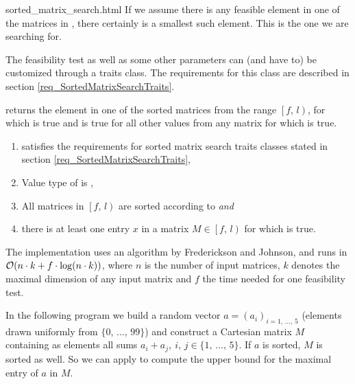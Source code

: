 \begin{ccAdvanced}
\begin{ccHtmlClassFile}{sorted_matrix_search.html}
    If we assume there is any feasible element in one of the matrices in
    , there
    certainly is a smallest such element. This is the one we are
    searching for.

    The feasibility test as well as some other parameters can (and have
    to) be customized through a traits class. The requirements for this
    class are described in section \ref{req_SortedMatrixSearchTraits}.


    \def\ccLongParamLayout{\ccTrue} 
    

    returns the element  in one of the sorted matrices from the
    range $\left[ f,\, l \right)$, for which 
    is true and  is true for all other
     values from any matrix for which  is true.
    
    \begin{enumerate}
    \item {} satisfies the requirements for sorted matrix search
      traits classes stated in section \ref{req_SortedMatrixSearchTraits},
    \item Value type of  is ,
    \item All matrices in $\left[ f,\, l \right)$ are sorted according to
       \textit{and}
    \item there is at least one entry $x$ in a matrix $M \in \left[ f,\, l
      \right)$ for which  is true.
    \end{enumerate}
    
    \ccImplementation The implementation uses an algorithm by
    Frederickson and Johnson\cite{fj-fkppc-83},\cite{fj-gsrsm-84} and
    runs in ${\cal O}(n \cdot k + f \cdot \log (n \cdot k))$, where $n$
    is the number of input matrices, $k$ denotes the maximal dimension
    of any input matrix and $f$ the time needed for one feasibility
    test.
    
    \ccExample In the following program we build a random vector $a =
    (a_i)_{i = 1,\,\ldots,\,5}$ (elements drawn uniformly from $\{
    0,\,\ldots,\,99 \}$) and construct a Cartesian matrix $M$ containing
    as elements all sums $a_i + a_j,\: i,\,j \in \{1,\,\ldots,\,5\}$. If
    $a$ is sorted, $M$ is sorted as well. So we can apply
     to compute the upper bound for the
    maximal entry of $a$ in $M$.
    

\end{ccHtmlClassFile}
\end{ccAdvanced}
